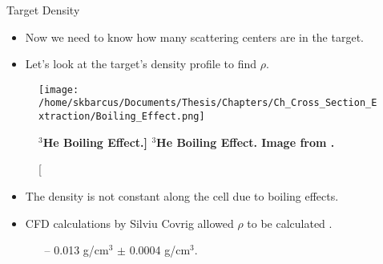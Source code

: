 \documentclass[10pt]{beamer}
\begin{document}
\begin{frame}[fragile]{Target Density}
	\begin{itemize}
		\item Now we need to know how many scattering centers are in the target.
		\pause
		\item Let's look at the target's density profile to find \alert{$\rho$}.
	\end{itemize}
	
	\begin{figure}[!ht]
	\begin{center}
	\texttt{[image: /home/skbarcus/Documents/Thesis/Chapters/Ch\_Cross\_Section\_Extraction/Boiling\_Effect.png]}
	\end{center}
	\caption[\bf{$^3$He Boiling Effect.}]{
	{\bf{$^3$He Boiling Effect.}} Image from \cite{Thesis:Ye}.}%
	\label{fig:boiling_effect}
	\end{figure}
	
	\pause
	\vspace{-5mm}
	\begin{itemize}
		\item The density is not constant along the cell due to \alert{boiling effects}.
		\item CFD calculations by Silviu Covrig allowed $\rho$ to be calculated \cite{density}.
		\begin{itemize}
			\item[--] \alert{0.013 g/cm$^3$} $\pm$ 0.0004 g/cm$^3$.
		\end{itemize}
	\end{itemize}
	
\end{frame}
\end{document}
